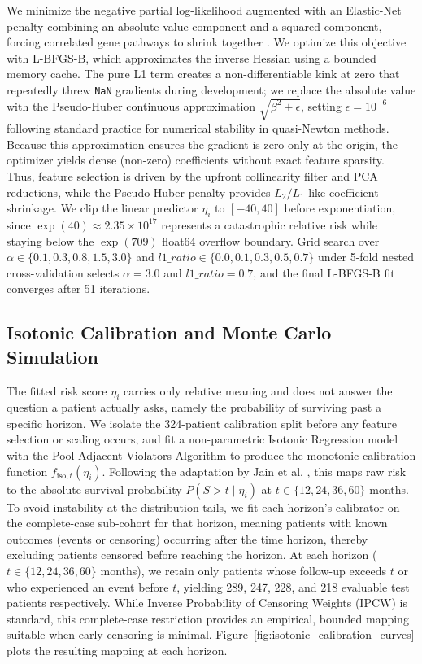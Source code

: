 \documentclass[sigconf, review=true]{acmart}
\begin{document}
We minimize the negative partial log-likelihood augmented with an Elastic-Net penalty combining an absolute-value component and a squared component, forcing correlated gene pathways to shrink together \cite{wu2012elastic, tibshirani1997lasso}. We optimize this objective with L-BFGS-B, which approximates the inverse Hessian using a bounded memory cache. The pure L1 term creates a non-differentiable kink at zero that repeatedly threw \texttt{NaN} gradients during development; we replace the absolute value with the Pseudo-Huber continuous approximation $\sqrt{\beta^2 + \epsilon}$, setting $\epsilon = 10^{-6}$ following standard practice for numerical stability in quasi-Newton methods. Because this approximation ensures the gradient is zero only at the origin, the optimizer yields dense (non-zero) coefficients without exact feature sparsity. Thus, feature selection is driven by the upfront collinearity filter and PCA reductions, while the Pseudo-Huber penalty provides $L_2/L_1$-like coefficient shrinkage. We clip the linear predictor $\eta_i$ to $[-40, 40]$ before exponentiation, since $\exp(40) \approx 2.35 \times 10^{17}$ represents a catastrophic relative risk while staying below the $\exp(709)$ float64 overflow boundary. Grid search over $\alpha \in \{0.1, 0.3, 0.8, 1.5, 3.0\}$ and $l1\_ratio \in \{0.0, 0.1, 0.3, 0.5, 0.7\}$ under 5-fold nested cross-validation selects $\alpha = 3.0$ and $l1\_ratio = 0.7$, and the final L-BFGS-B fit converges after 51 iterations.

\subsection{Isotonic Calibration and Monte Carlo Simulation}
The fitted risk score $\eta_i$ carries only relative meaning and does not answer the question a patient actually asks, namely the probability of surviving past a specific horizon. We isolate the 324-patient calibration split before any feature selection or scaling occurs, and fit a non-parametric Isotonic Regression model with the Pool Adjacent Violators Algorithm \cite{zadrozny2002transforming} to produce the monotonic calibration function $f_{\text{iso},t}(\eta_i)$. Following the adaptation by Jain et al. \cite{jain2024isotonic}, this maps raw risk to the absolute survival probability $P(S > t \mid \eta_i)$ at $t \in \{12, 24, 36, 60\}$ months. To avoid instability at the distribution tails, we fit each horizon's calibrator on the complete-case sub-cohort for that horizon, meaning patients with known outcomes (events or censoring) occurring after the time horizon, thereby excluding patients censored before reaching the horizon. At each horizon ($t \in \{12, 24, 36, 60\}$ months), we retain only patients whose follow-up exceeds $t$ or who experienced an event before $t$, yielding 289, 247, 228, and 218 evaluable test patients respectively. While Inverse Probability of Censoring Weights (IPCW) is standard, this complete-case restriction provides an empirical, bounded mapping suitable when early censoring is minimal. Figure~\ref{fig:isotonic_calibration_curves} plots the resulting mapping at each horizon.
\end{document}
